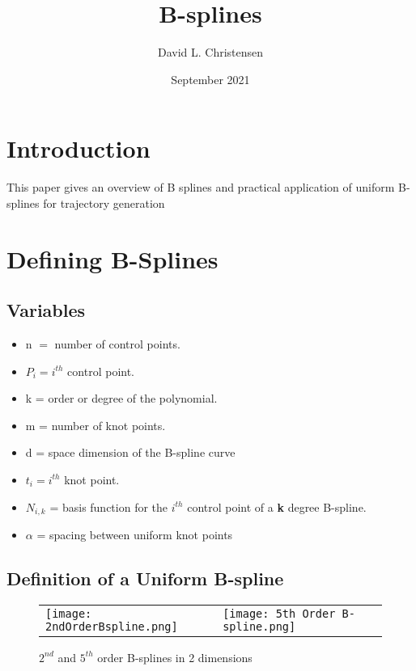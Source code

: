 \documentclass{article}
\title{B-splines}
\author{David L. Christensen}
\date{September 2021}
\begin{document}
\maketitle

\section{Introduction}
This paper gives an overview of B splines and practical application of uniform B-splines for trajectory generation

\section{Defining B-Splines}

\subsection{Variables}


\begin{itemize}
  \item[] n \(=\) number of control points.
  \item[] \(P_i = i^{th}\) control point.
  \item[] k = order or degree of the polynomial.
  \item[] m = number of knot points.
  \item[] d = space dimension of the B-spline curve
  \item[] \(t_i = i^{th}\) knot point.
  \item[] \(N_{i , k}\) = basis function for the \(i^{th}\) control point of a \textbf{k} degree B-spline.
  \item[] \(\alpha\) = spacing between uniform knot points
\end{itemize}

\subsection{Definition of a Uniform B-spline}

\begin{figure}[h]
\begin{tabular}{ll}
\texttt{[image: 2ndOrderBspline.png]}
&
\texttt{[image: 5th Order B-spline.png]}
\end{tabular}
\caption{$2^{nd}$ and $5^{th}$ order B-splines in 2 dimensions}
\label{Fig:Uniform B-splines}
\end{figure}
\end{document}
